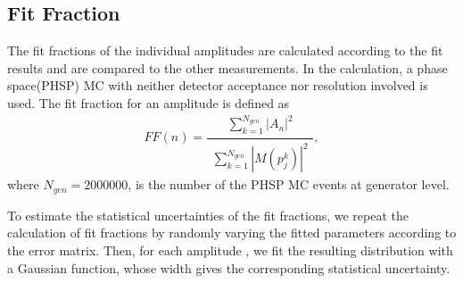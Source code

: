 \subsection{Fit Fraction}
\par{
The fit fractions of the individual amplitudes are calculated according to the fit results and are compared to the other measurements. In the calculation, a phase space(PHSP) MC with neither detector acceptance nor resolution involved is used. The fit fraction for an amplitude is defined as
    \begin{equation}
    FF(n) = \frac{\begin{matrix}\sum_{k=1}^{N_{gen}} \left|A_{n}\right|^{2}\end{matrix}}{\begin{matrix}\sum_{k=1}^{N_{gen}} \left|M(p_{j}^{k})\right|^{2}\end{matrix}}, \label{Fit-Fraction-Definition}
    \end{equation}
    where $N_{gen} = 2000000$, is the number of the PHSP MC events at generator level. 

    To estimate the statistical uncertainties of the fit fractions, we repeat the calculation of fit fractions by randomly varying the fitted parameters according to the error matrix. 
    Then, for each amplitude , we fit the resulting distribution with a Gaussian function, whose width gives the corresponding statistical uncertainty.
}

